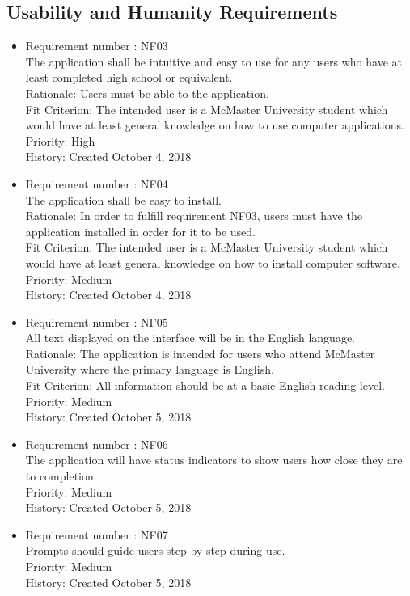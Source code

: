 \documentclass[12pt, titlepage]{article}
\begin{document}
\subsection{Usability and Humanity Requirements}
\begin{itemize}
\item Requirement number : NF03 \\
The application shall be intuitive and easy to use for any users who have at least completed high school or equivalent.\\
Rationale: Users must be able to the application.\\
Fit Criterion: The intended user is a McMaster University student which would have at least general knowledge on how to use computer applications.\\
Priority: High\\
History: Created October 4, 2018

\item Requirement number : NF04 \\
The application shall be easy to install.\\
Rationale: In order to fulfill requirement NF03, users must have the application installed in order for it to be used.\\
Fit Criterion: The intended user is a McMaster University student which would have at least general knowledge on how to install computer software.\\
Priority: Medium\\
History: Created October 4, 2018

\item Requirement number : NF05\\
All text displayed on the interface will be in the English language.\\
Rationale: The application is intended for users who attend McMaster University where the primary language is English.\\
Fit Criterion: All information should be at a basic English reading level.\\
Priority: Medium\\
History: Created October 5, 2018

\item Requirement number : NF06 \\
The application will have status indicators to show users how close they are to completion.\\
Priority: Medium\\
History: Created October 5, 2018

\item Requirement number : NF07\\
Prompts should guide users step by step during use.\\
Priority: Medium\\
History: Created October 5, 2018

\end{itemize}
\end{document}
